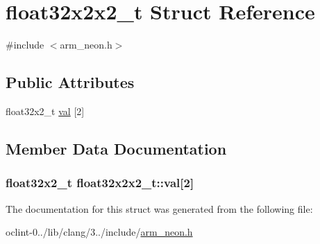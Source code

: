 \hypertarget{structfloat32x2x2__t}{\section{float32x2x2\-\_\-t Struct Reference}
\label{structfloat32x2x2__t}
}


{\ttfamily \#include $<$arm\-\_\-neon.\-h$>$}

\subsection*{Public Attributes}
\begin{DoxyCompactItemize}
\item 
float32x2\-\_\-t \hyperlink{structfloat32x2x2__t_aa70e912208d7ba33f515947dbbf5d19d}{val} \mbox{[}2\mbox{]}
\end{DoxyCompactItemize}


\subsection{Member Data Documentation}
\hypertarget{structfloat32x2x2__t_aa70e912208d7ba33f515947dbbf5d19d}{
\subsubsection[{val}]{\setlength{\rightskip}{0pt plus 5cm}float32x2\-\_\-t float32x2x2\-\_\-t\-::val\mbox{[}2\mbox{]}}}\label{structfloat32x2x2__t_aa70e912208d7ba33f515947dbbf5d19d}


The documentation for this struct was generated from the following file\-:\begin{DoxyCompactItemize}
\item 
oclint-\/0../lib/clang/3../include/\hyperlink{arm__neon_8h}{arm\-\_\-neon.\-h}\end{DoxyCompactItemize}
